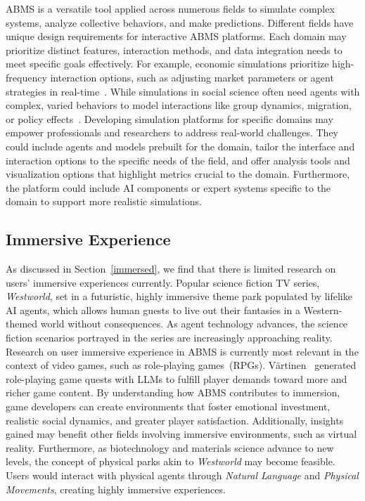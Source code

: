 ABMS is a versatile tool applied across numerous fields to simulate complex systems, analyze collective behaviors, and make predictions.
Different fields have unique design requirements for interactive ABMS platforms.
Each domain may prioritize distinct features, interaction methods, and data integration needs to meet specific goals effectively.
For example, economic simulations prioritize high-frequency interaction options, such as adjusting market parameters or agent strategies in real-time~\cite{helbing_agent-based_2012}.
While simulations in social science often need agents with complex, varied behaviors to model interactions like group dynamics, migration, or policy effects~\cite{gao2023s3socialnetworksimulationlarge}.
Developing simulation platforms for specific domains may empower professionals and researchers to address real-world challenges.
They could include agents and models prebuilt for the domain, tailor the interface and interaction options to the specific needs of the field, and offer analysis tools and visualization options that highlight metrics crucial to the domain.
Furthermore, the platform could include AI components or expert systems specific to the domain to support more realistic simulations.




\subsection{Immersive Experience}\label{immersive}%
As discussed in Section~\ref{immersed}, we find that there is limited research on users' immersive experiences currently.
Popular science fiction TV series, \textit{Westworld}, set in a futuristic, highly immersive theme park populated by lifelike AI agents, which allows human guests to live out their fantasies in a Western-themed world without consequences.
As agent technology advances, the science fiction scenarios portrayed in the series are increasingly approaching reality.
Research on user immersive experience in ABMS is currently most relevant in the context of video games, such as role-playing games~(RPGs).
Värtinen\etal~\cite{c7c0852d5f324ba5907ee22bea26560c} generated role-playing game quests with LLMs to fulfill player demands toward more and richer game content.
By understanding how ABMS contributes to immersion, game developers can create environments that foster emotional investment, realistic social dynamics, and greater player satisfaction.
Additionally, insights gained may benefit other fields involving immersive environments, such as virtual reality.
Furthermore, as biotechnology and materials science advance to new levels, the concept of physical parks akin to \textit{Westworld} may become feasible.
Users would interact with physical agents through \textit{Natural Language} and \textit{Physical Movements}, creating highly immersive experiences.

